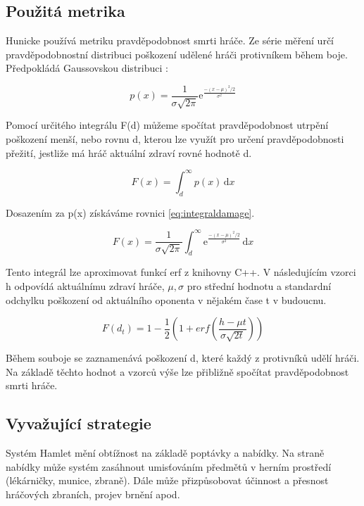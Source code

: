 \subsection{Použitá metrika}

Hunicke používá metriku pravděpodobnost smrti hráče. Ze série měření určí pravděpodobnostní distribuci poškození udělené hráči protivníkem během boje. Předpokládá Gaussovskou distribuci :

\begin{equation}
	   p(x)=\frac{1}{\sigma\sqrt{2\pi}}\mathrm{e}^{\frac{-(x-\mu)^2/2}{\sigma^2}}
\end{equation}

Pomocí určitého integrálu F(d) můžeme spočítat pravděpodobnost utrpění poškození menší, nebo rovnu d, kterou lze využít pro určení pravděpodobnosti přežití, jestliže má hráč aktuální zdraví rovné hodnotě d.

\begin{equation}
	   F(x) = \int_d^\infty p(x)\,\mathrm{d}x
\end{equation}

Dosazením za p(x) získáváme rovnici \ref{eq:integraldamage}.

\begin{equation} \label{eq:integraldamage}
	   F(x) = \frac{1}{\sigma\sqrt{2\pi}}\int_d^\infty \mathrm{e}^{\frac{-(x-\mu)^2/2}{\sigma^2}}\,\mathrm{d}x
\end{equation}

Tento integrál lze aproximovat funkcí erf z knihovny C++. V následujícím vzorci h odpovídá aktuálnímu zdraví hráče, $\mu, \sigma$ pro střední hodnotu a standardní odchylku poškození od aktuálního oponenta v nějakém čase t v budoucnu.

\begin{equation}
	   F(d_t) = 1-\frac{1}{2}(1+erf(\frac{h-\mu t}{\sigma\sqrt{2t}}))
\end{equation}

Během souboje se zaznamenává poškození d, které každý z protivníků udělí hráči. Na základě těchto hodnot a vzorců výše lze přibližně spočítat pravděpodobnost smrti hráče.

\subsection{Vyvažující strategie}

Systém Hamlet mění obtížnost na základě poptávky a nabídky. Na straně nabídky může systém zasáhnout umisťováním předmětů v herním prostředí (lékárničky, munice, zbraně). Dále může přizpůsobovat účinnost a přesnost hráčových zbraních, projev brnění apod.

